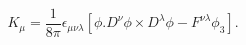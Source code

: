 \begin{equation}
K_\mu =\frac{1}{8\pi}\epsilon_{\mu\nu\lambda}\left[ \phi .D^\nu
\phi \times D^\lambda \phi -F^{\nu\lambda}\phi_3\right].
\end{equation} 
